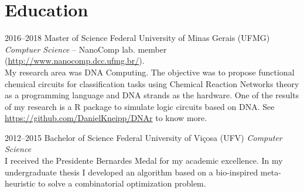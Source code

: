 \documentclass[a4paper]{cv-friggeri-x}
\begin{document}



\section{Education}

\begin{entrylist}

\entry
    {2016--2018}
    {Master {\normalfont of Science}}
    {Federal University of Minas Gerais (UFMG)}
    {\emph{Comptuer Science} --
    \footnotesize{NanoComp lab. member (\href{http://www.nanocomp.dcc.ufmg.br/}{http://www.nanocomp.dcc.ufmg.br/}).}\\
    \normalsize{My research area was DNA Computing. The objective was to propose functional chemical circuits for classification tasks using Chemical Reaction Networks theory as a programming language and DNA strands as the hardware. One of the results of my research is a R package to simulate logic circuits based on DNA. See \href{https://github.com/DanielKneipp/DNAr}{https://github.com/DanielKneipp/DNAr} to know more.}}

\entry
    {2012--2015}
    {Bachelor {\normalfont of Science}}
    {Federal University of Vi\c cosa (UFV)}
    {\emph{Computer Science}\\
    I received the Presidente Bernardes Medal for my academic excellence. In my undergraduate thesis I developed an algorithm based on a bio-inspired meta-heuristic to solve a combinatorial optimization problem.}





\end{entrylist}
\end{document}
